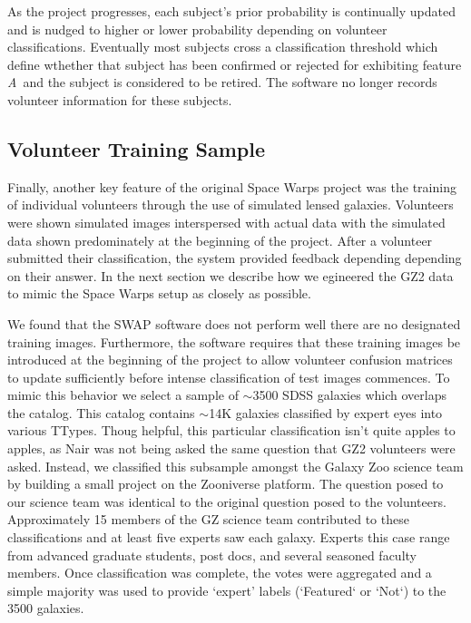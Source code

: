\documentclass[twocolumn]{aastex6}
\newcommand{\A}{\textit{A}}
\begin{document}
As the project progresses, each subject's prior probability is continually updated 
and is nudged to higher or lower probability depending on volunteer classifications. 
Eventually most subjects cross a classification threshold which define wthether that
subject has been confirmed or rejected for exhibiting feature \A~and the subject
is considered to be retired.  The software no longer records volunteer information 
for these subjects. 

\subsection{Volunteer Training Sample}

Finally, another key feature of the original Space Warps project was the training of 
individual volunteers through the use of simulated lensed galaxies. Volunteers were 
shown simulated images interspersed with actual data with the simulated data shown
predominately at the beginning of the project. After a volunteer submitted their 
classification, the system provided feedback depending depending on their answer. 
In the next section we describe how we egineered the GZ2 data to mimic the Space 
Warps setup as closely as possible.

We found that the SWAP software does not perform well there are no designated 
training images. Furthermore, the software requires that these training images
be introduced at the beginning of the project to allow volunteer confusion matrices
to update sufficiently before intense classification of test images commences. 
To mimic this behavior we select a sample of $\sim$3500 SDSS galaxies which 
overlaps the \cite{NairAbraham2010} catalog. This catalog contains $\sim$14K 
galaxies classified by expert eyes into various TTypes. Thoug helpful, this particular
classification isn't quite apples to apples, as Nair was not being asked the same 
question that GZ2 volunteers were asked.  Instead, we classified this subsample 
amongst the Galaxy Zoo science team by building a small project on the Zooniverse
platform. The question posed to our science team was identical to the original 
question posed to the volunteers. Approximately 15 members of the GZ science team
contributed to these classifications and at least five experts saw each galaxy. Experts 
this case range from advanced graduate students, post docs, and several 
seasoned faculty members. Once
classification was complete, the votes were aggregated and a simple majority was 
used to provide `expert' labels (`Featured` or `Not`) to the 3500 galaxies. 
\end{document}
